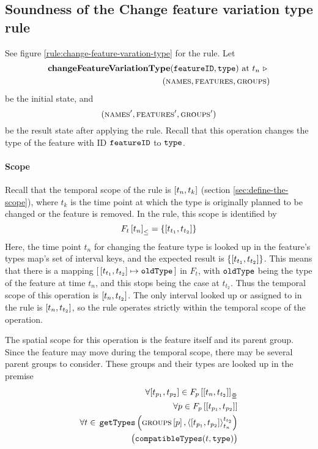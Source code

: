 
\subsection{Soundness of the Change feature variation type rule} 
\label{sub:soundness-of-the-change-feature-variation-type-rule}

See figure \vref{rule:change-feature-varation-type} for the  rule. Let 
\begin{equation*}
   \begin{split}
      \textbf{changeFeatureVariationType}(\texttt{featureID}, \texttt{type}) \text{ at } t_n \ \triangleright \  \\
      (\textsc{names}, \textsc{features}, \textsc{groups}{})
   \end{split}
\end{equation*}
be the initial state, and
\[
   (\textsc{names}', \textsc{features}', \textsc{groups}{}')
\]
be the result state after applying the  rule. Recall that this operation changes the type of the feature with ID $\texttt{featureID}$ to $\texttt{type}$.

\paragraph{Scope}
Recall that the temporal scope of the  rule is $\interval{t_n}{t_k}$ (section \vref{sec:define-the-scope}), where $t_k$ is the time point at which the type is originally planned to be changed or the feature is removed. In the rule, this scope is identified by 
   \[
      \containing{F_t}{t_n} = \set{\interval{t_{t_1}}{t_{t_2}}}
   \]
   Here, the time point $t_n$ for changing the feature type is looked up in the feature's types map's set of interval keys, and the expected result is $\set{\interval{t_{t_1}}{t_{t_2}}}$. This means that there is a mapping $\intervalmapping{t_{t_1}}{t_{t_2}}{\var{oldType}}$ in $F_t$, with $\texttt{oldType}$ being the type of the feature at time $t_n$, and this stops being the case at $t_{t_2}$. Thus the temporal scope of this operation is $\interval{t_n}{t_{t_2}}$. The only interval looked up or assigned to in the rule is $\interval{t_n}{t_{t_2}}$, so the rule operates strictly within the temporal scope of the operation.

   The spatial scope for this operation is the feature itself and its parent group. Since the feature may move during the temporal scope, there may be several parent groups to consider. These groups and their types are looked up in the premise
\[
   \begin{split}
      \forall \interval{t_{p_1}}{t_{p_2}} \in \overlapping{F_p}{t_n}{t_{t_2}}  \\ %
      \forall p \in \lookup{F_p}{\interval{t_{p_1}}{t_{p_2}}}  \\%
      \forall t \in \, \var{getTypes}\left(\lookup{\groups}{p}, \clamp{\interval{t_{p_1}}{t_{p_2}}}{t_n}{t_{t_2}}\right)  \\
          \big(\var{compatibleTypes}(t, \var{type})\big) 
    \end{split}
\]

